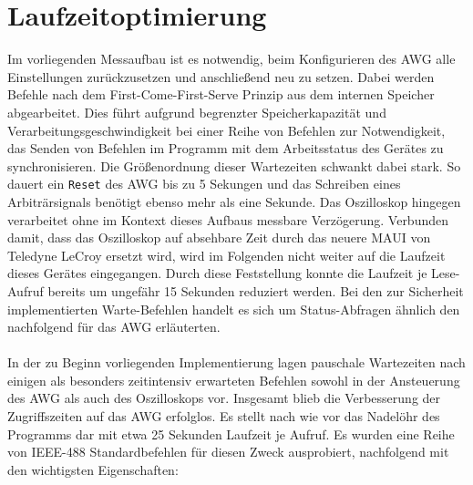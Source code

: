 \documentclass[../Report.tex]{subfiles}
\begin{document}
\section{Laufzeitoptimierung}
Im vorliegenden Messaufbau ist es notwendig, beim Konfigurieren des AWG alle Einstellungen zurückzusetzen und anschließend neu zu setzen. Dabei werden Befehle nach dem First-Come-First-Serve Prinzip aus dem internen Speicher abgearbeitet. Dies führt aufgrund begrenzter Speicherkapazität und Verarbeitungsgeschwindigkeit bei einer Reihe von Befehlen zur Notwendigkeit, das Senden von Befehlen im Programm mit dem Arbeitsstatus des Gerätes zu synchronisieren. 
Die Größenordnung dieser Wartezeiten schwankt dabei stark. So dauert ein \lstinline{Re}\lstinline{set} des AWG bis zu 5 Sekungen und das Schreiben eines Arbiträrsignals benötigt ebenso mehr als eine Sekunde. Das Oszilloskop hingegen verarbeitet ohne im Kontext dieses Aufbaus messbare Verzögerung. Verbunden damit, dass das Oszilloskop auf absehbare Zeit durch das neuere MAUI von Teledyne LeCroy ersetzt wird, wird im Folgenden nicht weiter auf die Laufzeit dieses Gerätes eingegangen. Durch diese Feststellung konnte die Laufzeit je Lese-Aufruf bereits um ungefähr 15 Sekunden reduziert werden.
Bei den zur Sicherheit implementierten Warte-Befehlen handelt es sich um Status-Abfragen ähnlich den nachfolgend für das AWG erläuterten.
\\
\\
\noindent
In der zu Beginn vorliegenden Implementierung lagen pauschale Wartezeiten nach einigen als besonders zeitintensiv erwarteten Befehlen sowohl in der Ansteuerung des AWG als auch des Oszilloskops vor. 
Insgesamt blieb die Verbesserung der Zugriffszeiten auf das AWG erfolglos. Es stellt nach wie vor das Nadelöhr des Programms dar mit etwa 25 Sekunden Laufzeit je Aufruf. 
Es wurden eine Reihe von IEEE-488 Standardbefehlen für diesen Zweck ausprobiert, nachfolgend mit den wichtigsten Eigenschaften:
\end{document}
